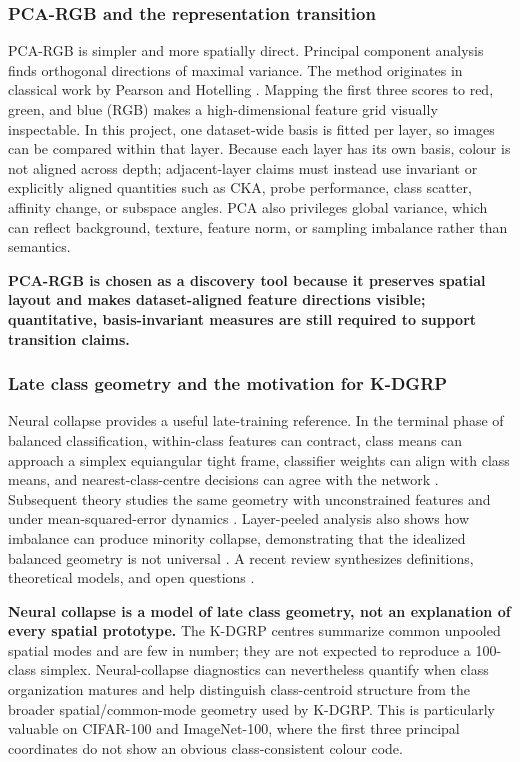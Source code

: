 \subsubsection{PCA-RGB and the representation transition}

PCA-RGB is simpler and more spatially direct. Principal component analysis
finds orthogonal directions of maximal variance. The method originates in
classical work by Pearson and Hotelling
\cite{pearson1901pca,hotelling1933pca}. Mapping
the first three scores to red, green, and blue (RGB) makes a high-dimensional
feature grid visually
inspectable. In this project, one dataset-wide basis is fitted per layer, so
images can be compared within that layer. Because each layer has its own basis,
colour is not aligned across depth; adjacent-layer claims must instead use
invariant or explicitly aligned quantities such as CKA, probe performance,
class scatter, affinity change, or subspace angles. PCA also privileges global
variance, which can reflect background, texture, feature norm, or sampling
imbalance rather than semantics.

\textbf{PCA-RGB is chosen as a discovery tool because it preserves spatial
layout and makes dataset-aligned feature directions visible; quantitative,
basis-invariant measures are still required to support transition claims.}

\subsubsection{Late class geometry and the motivation for K-DGRP}

Neural collapse provides a useful late-training reference. In the terminal
phase of balanced classification, within-class features can contract, class
means can approach a simplex equiangular tight frame, classifier weights can
align with class means, and nearest-class-centre decisions can agree with the
network \cite{papyan2020neuralcollapse}. Subsequent theory studies the same
geometry with unconstrained features and under mean-squared-error dynamics
\cite{zhu2021neuralcollapse,han2022neuralcollapse}. Layer-peeled analysis also
shows how imbalance can produce minority collapse, demonstrating that the
idealized balanced geometry is not universal \cite{fang2021layerpeeled}. A
recent review synthesizes definitions, theoretical models, and open questions
\cite{kothapalli2023neuralcollapse}.

\textbf{Neural collapse is a model of late class geometry, not an explanation
of every spatial prototype.} The K-DGRP centres summarize common unpooled
spatial modes and are few in number; they are not expected to reproduce a
100-class simplex. Neural-collapse diagnostics can nevertheless quantify when
class organization matures and help distinguish class-centroid structure from
the broader spatial/common-mode geometry used by K-DGRP. This is particularly
valuable on CIFAR-100 and ImageNet-100, where the first three principal
coordinates do not show an obvious class-consistent colour code.

